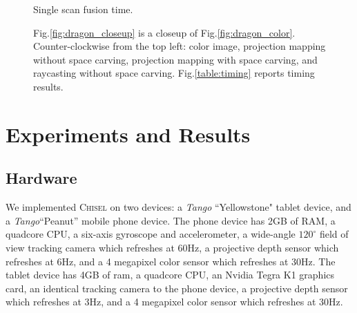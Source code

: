 \documentclass[conference]{IEEEtran}
\newcommand{\figref}[1]{Fig.\ref{#1}}
\newcommand{\Tango}{\textit{Tango}\xspace}
\newcommand{\chisel}{\textsc{Chisel}\xspace}
\begin{document}
\begin{figure} [htb]
\begin{subtable}[b]{0.4\linewidth}
			\caption{Single scan fusion time.}
			\label{table:timing}
	 \end{subtable} 
	 \caption{\figref{fig:dragon_closeup} is a closeup of
	 \figref{fig:dragon_color}.
	 Counter-clockwise from the top left: color image, projection mapping without
	 space carving, projection mapping with space carving, and raycasting without
	 space carving. \figref{table:timing} reports timing results.}
	 \label{fig:device_data}
 \end{figure} 

\section{Experiments and Results}
\label{section:experiments}
\subsection{Hardware}
\label{section:hardware}
We implemented \chisel on two devices: a \Tango
``Yellowstone" tablet device, and a \Tango ``Peanut'' mobile 
phone device. The phone device has 2GB of RAM, a quadcore
CPU, a six-axis gyroscope and accelerometer, a wide-angle $120^\circ$ field of
view tracking camera which refreshes at 60Hz, a projective depth sensor which
refreshes at 6Hz, and a 4 megapixel color sensor which refreshes at 30Hz. The
tablet device has 4GB of ram, a quadcore CPU, an Nvidia Tegra K1 graphics card,
an identical tracking camera to the phone device, a projective depth sensor
which refreshes at 3Hz, and a 4 megapixel color sensor which refreshes at 30Hz.
\end{document}
